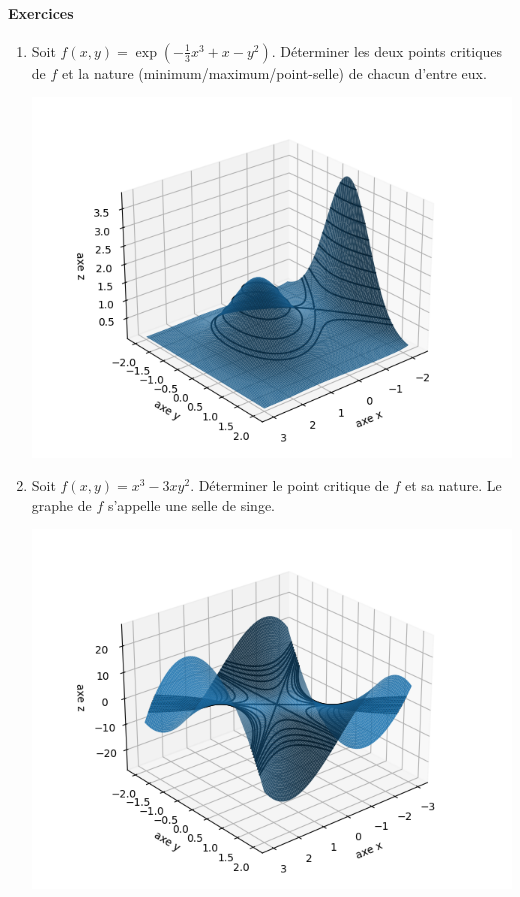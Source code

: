 \paragraph{Exercices}
    \begin{enumerate}
        \item Soit $f(x,y)=\exp(-\frac 13 x^3 + x - y^2)$. Déterminer les deux points critiques de $f$ et la nature (minimum/maximum/point-selle) de chacun d'entre eux.

\begin{center}
\includegraphics[scale=\myscale,scale=0.6]{figures/fonctions-extrem-7}
\end{center}



        \item Soit $f(x,y)=x^3-3xy^2$. Déterminer le point critique de $f$ et sa nature.
        Le graphe de $f$ s'appelle une \og{}selle de singe\fg{}.

\begin{center}
\includegraphics[scale=\myscale,scale=0.6]{figures/fonctions-extrem-6}
\end{center}


\end{enumerate}
